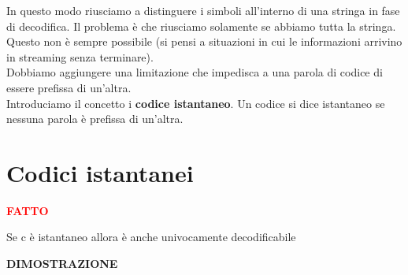 \documentclass{article}
\begin{document}
    \noindent In questo modo riusciamo a distinguere i simboli all'interno di una stringa in fase di decodifica. Il problema è che riusciamo solamente se abbiamo tutta la stringa. Questo non è sempre possibile (si pensi a situazioni in cui le informazioni arrivino in streaming senza terminare). \\ Dobbiamo aggiungere una limitazione che impedisca a una parola di codice di essere prefissa di un'altra. \\
    Introduciamo il concetto i \textbf{codice istantaneo}. Un codice si dice istantaneo se nessuna parola è prefissa di un'altra.

    \section{Codici istantanei}

    \vspace{5px}
    \begin{tcolorbox}
        \textbf{\textcolor{red}{FATTO}}
        \begin{center}
            Se c è istantaneo allora è anche univocamente decodificabile
        \end{center}
    \end{tcolorbox}

    \vspace{5px}

    \noindent \textbf{DIMOSTRAZIONE}
    \vspace{5px}
\end{document}
